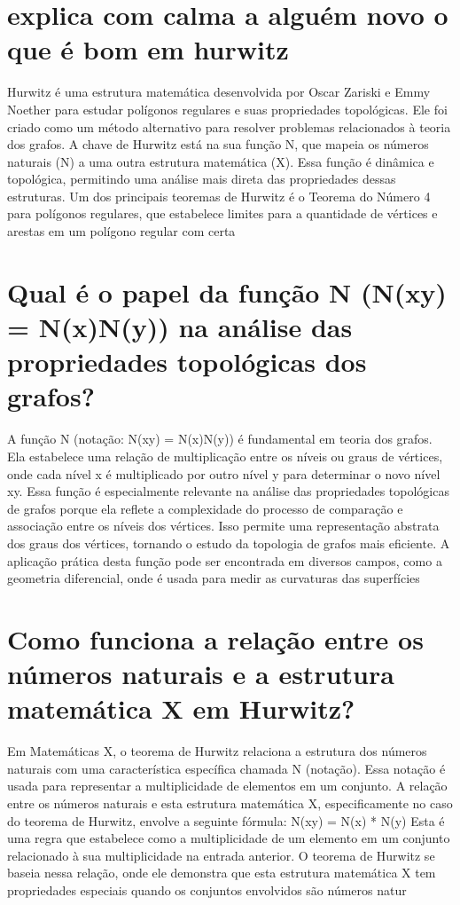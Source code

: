 \documentclass[11pt,a4paper]{article}
\begin{document}
\section{explica com calma a alguém novo o que é bom em hurwitz}
Hurwitz é uma estrutura matemática desenvolvida por Oscar Zariski e Emmy Noether para estudar polígonos regulares e suas propriedades topológicas. Ele foi criado como um método alternativo para resolver problemas relacionados à teoria dos grafos. A chave de Hurwitz está na sua função N, que mapeia os números naturais (N) a uma outra estrutura matemática (X). Essa função é dinâmica e topológica, permitindo uma análise mais direta das propriedades dessas estruturas. Um dos principais teoremas de Hurwitz é o Teorema do Número 4 para polígonos regulares, que estabelece limites para a quantidade de vértices e arestas em um polígono regular com certa

\section{Qual é o papel da função N (N(xy) = N(x)N(y)) na análise das propriedades topológicas dos grafos?}
A função N (notação: N(xy) = N(x)N(y)) é fundamental em teoria dos grafos. Ela estabelece uma relação de multiplicação entre os níveis ou graus de vértices, onde cada nível x é multiplicado por outro nível y para determinar o novo nível xy. Essa função é especialmente relevante na análise das propriedades topológicas de grafos porque ela reflete a complexidade do processo de comparação e associação entre os níveis dos vértices. Isso permite uma representação abstrata dos graus dos vértices, tornando o estudo da topologia de grafos mais eficiente. A aplicação prática desta função pode ser encontrada em diversos campos, como a geometria diferencial, onde é usada para medir as curvaturas das superfícies

\section{Como funciona a relação entre os números naturais e a estrutura matemática X em Hurwitz?}
Em Matemáticas X, o teorema de Hurwitz relaciona a estrutura dos números naturais com uma característica específica chamada N (notação). Essa notação é usada para representar a multiplicidade de elementos em um conjunto. A relação entre os números naturais e esta estrutura matemática X, especificamente no caso do teorema de Hurwitz, envolve a seguinte fórmula: N(xy) = N(x) * N(y) Esta é uma regra que estabelece como a multiplicidade de um elemento em um conjunto relacionado à sua multiplicidade na entrada anterior. O teorema de Hurwitz se baseia nessa relação, onde ele demonstra que esta estrutura matemática X tem propriedades especiais quando os conjuntos envolvidos são números natur
\end{document}
